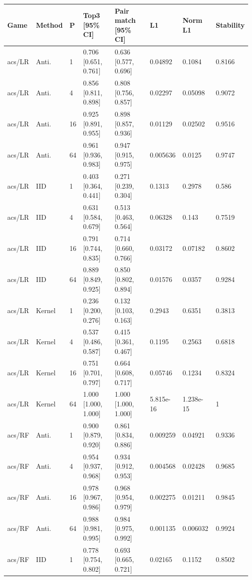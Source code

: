 \begingroup\footnotesize\setlength{\tabcolsep}{3pt}
\begin{tabular}{llllllll}
\toprule
Game & Method & P & Top3 [95\% CI] & Pair match [95\% CI] & L1 & Norm L1 & Stability \\
\midrule
acs/LR & Anti. & 1 & 0.706 [0.651, 0.761] & 0.636 [0.577, 0.696] & 0.04892 & 0.1084 & 0.8166 \\
acs/LR & Anti. & 4 & 0.856 [0.811, 0.898] & 0.808 [0.756, 0.857] & 0.02297 & 0.05098 & 0.9072 \\
acs/LR & Anti. & 16 & 0.925 [0.891, 0.955] & 0.898 [0.857, 0.936] & 0.01129 & 0.02502 & 0.9516 \\
acs/LR & Anti. & 64 & 0.961 [0.936, 0.983] & 0.947 [0.915, 0.975] & 0.005636 & 0.0125 & 0.9747 \\
acs/LR & IID & 1 & 0.403 [0.364, 0.441] & 0.271 [0.239, 0.304] & 0.1313 & 0.2978 & 0.586 \\
acs/LR & IID & 4 & 0.631 [0.584, 0.679] & 0.513 [0.463, 0.564] & 0.06328 & 0.143 & 0.7519 \\
acs/LR & IID & 16 & 0.791 [0.744, 0.835] & 0.714 [0.660, 0.766] & 0.03172 & 0.07182 & 0.8602 \\
acs/LR & IID & 64 & 0.889 [0.849, 0.925] & 0.850 [0.802, 0.894] & 0.01576 & 0.0357 & 0.9284 \\
acs/LR & Kernel & 1 & 0.236 [0.200, 0.276] & 0.132 [0.103, 0.163] & 0.2943 & 0.6351 & 0.3813 \\
acs/LR & Kernel & 4 & 0.537 [0.486, 0.587] & 0.415 [0.361, 0.467] & 0.1195 & 0.2563 & 0.6818 \\
acs/LR & Kernel & 16 & 0.751 [0.701, 0.797] & 0.664 [0.608, 0.717] & 0.05746 & 0.1234 & 0.8324 \\
acs/LR & Kernel & 64 & 1.000 [1.000, 1.000] & 1.000 [1.000, 1.000] & 5.815e-16 & 1.238e-15 & 1 \\
acs/RF & Anti. & 1 & 0.900 [0.879, 0.920] & 0.861 [0.834, 0.886] & 0.009259 & 0.04921 & 0.9336 \\
acs/RF & Anti. & 4 & 0.954 [0.937, 0.968] & 0.934 [0.912, 0.953] & 0.004568 & 0.02428 & 0.9685 \\
acs/RF & Anti. & 16 & 0.978 [0.967, 0.986] & 0.968 [0.954, 0.979] & 0.002275 & 0.01211 & 0.9845 \\
acs/RF & Anti. & 64 & 0.988 [0.981, 0.995] & 0.984 [0.975, 0.992] & 0.001135 & 0.006032 & 0.9924 \\
acs/RF & IID & 1 & 0.778 [0.754, 0.802] & 0.693 [0.665, 0.721] & 0.02165 & 0.1152 & 0.8502 \\

\end{tabular}
